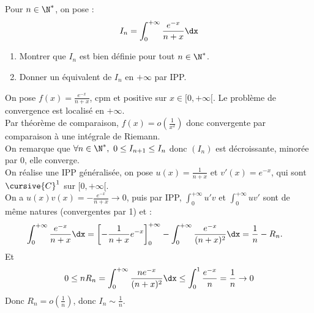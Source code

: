 \documentclass[11pt]{article}
\begin{document}
\begin{exercice}{}{}
    Pour $n\in\N^*$, on pose :
    \begin{equation*}
        I_n = \int_0^{+\infty} \frac{e^{-x}}{n+x}\dx 
    \end{equation*}
    \begin{enumerate}
        \item Montrer que $I_n$ est bien définie pour tout $n\in\N^*$.
        \item Donner un équivalent de $I_n$ en $+\infty$ par IPP.
    \end{enumerate}
    \tcblower
     On pose $f(x)=\frac{e^{-x}}{n+x}$, cpm et positive sur $x\in[0,+\infty[$. Le problème de convergence est localisé en $+\infty$.\\
    Par théorème de comparaison, $f(x)=o(\frac{1}{x^2})$ donc convergente par comparaison à une intégrale de Riemann.\\
    On remarque que $\forall n \in \N^*, ~ 0 \leq I_{n+1} \leq I_n$ donc $(I_n)$ est décroissante, minorée par 0, elle converge.\\
     On réalise une IPP généralisée, on pose $u(x)=\frac{1}{n+x}$ et $v'(x)=e^{-x}$, qui sont $\cursive{C}^1$ sur $[0,+\infty[$.\\
    On a $u(x)v(x)=-\frac{e^{-x}}{n+x}\to 0$, puis par IPP, $\int_0^{+\infty}u'v$ et $\int_0^{+\infty}uv'$ sont de même natures (convergentes par 1) et :
    \begin{align*}
        \int_0^{+\infty}\frac{e^{-x}}{n+x}\dx &= \left[ -\frac{1}{n+x}e^{-x} \right]_0^{+\infty} - \int_0^{+\infty} \frac{e^{-x}}{(n+x)^2}\dx = \frac{1}{n} - R_n.
    \end{align*}
    Et \begin{equation*}0 \leq nR_n = \int_0^{+\infty}\frac{ne^{-x}}{(n+x)^2}\dx\leq\int_0^1\frac{e^{-x}}{n}=\frac{1}{n}\to0\end{equation*}
    Donc $R_n=o(\frac{1}{n})$, donc $I_n\sim\frac{1}{n}$.
\end{exercice}
\end{document}
